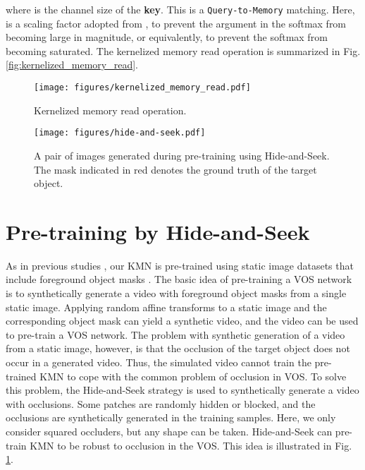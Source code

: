 \documentclass[runningheads]{llncs}
\begin{document}
where  is the channel size of the \textbf{key}. This is a \texttt{Query-to-Memory} matching. Here,  is a scaling factor adopted from \cite{vaswani2017attention}, to prevent the argument in the softmax from becoming large in magnitude, or equivalently, to prevent the softmax from becoming saturated. The kernelized memory read operation is summarized in Fig. \ref{fig:kernelized_memory_read}.


\begin{figure}[t]
\centering
\begin{minipage}[]{0.5\linewidth}
\texttt{[image: figures/kernelized\_memory\_read.pdf]}
\caption{Kernelized memory read operation.}
\label{fig:kernelized_memory_read}
\end{minipage}\hfill \begin{minipage}[]{0.45\linewidth}
\texttt{[image: figures/hide-and-seek.pdf]}
\caption{A pair of images generated during pre-training using Hide-and-Seek. The mask indicated in red denotes the ground truth of the target object.}
\label{fig:hide-and-seek}
\end{minipage} 
\end{figure}



\section{Pre-training by Hide-and-Seek}
\label{s33}
As in previous studies \cite{perazzi2017learning,wug2018fast,Oh_2019_ICCV}, our KMN is pre-trained using static image datasets that include foreground object masks \cite{b42,b43,hariharan2011semantic,shi2015hierarchical,cheng2014global,wang2017salient}. The basic idea of pre-training a VOS network is to synthetically generate a video with foreground object masks from a single static image. Applying random affine transforms to a static image and the corresponding object mask can yield a synthetic video, and the video can be used to pre-train a VOS network. The problem with synthetic generation of a video from a static image, however, is that the occlusion of the target object does not occur in a generated video. Thus, the simulated video cannot train the pre-trained KMN to cope with the common problem of occlusion in VOS. To solve this problem, the Hide-and-Seek strategy is used to synthetically generate a video with occlusions. Some patches are randomly hidden or blocked, and the occlusions are synthetically generated in the training samples. Here, we only consider squared occluders, but any shape can be taken. Hide-and-Seek can pre-train KMN to be robust to occlusion in the VOS. This idea is illustrated in Fig. \ref{fig:hide-and-seek}.
\end{document}
